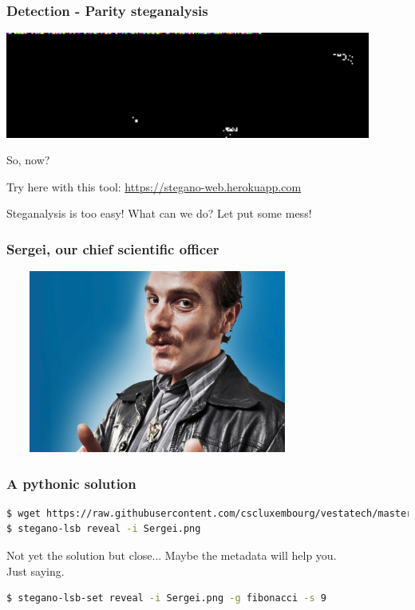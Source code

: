 \documentclass[]{beamer}
\begin{document}
\begin{frame}
\frametitle{Detection - Parity steganalysis}
\begin{center}
\includegraphics[width=12.0cm]{./images/vesta_steg_zoom.png}
\end{center}
\bigskip
So, now?

\bigskip
Try here with this tool: \href{https://stegano-web.herokuapp.com}{https://stegano-web.herokuapp.com}

\bigskip 
Steganalysis is too easy! What can we do? Let put some mess!
\end{frame}

\begin{frame}
\frametitle{Sergei, our chief scientific officer}
\begin{center}
    \includegraphics[height=6.0cm, width=10.0cm]{./images/Sergei.png}
\end{center}
\end{frame}

\begin{frame}[fragile]
\frametitle{A pythonic solution}
\begin{lstlisting}[language=Bash]
$ wget https://raw.githubusercontent.com/cscluxembourg/vestatech/master/challenges/sergei/Sergei.png
$ stegano-lsb reveal -i Sergei.png
\end{lstlisting}
Not yet the solution but close... Maybe the metadata will help you.\\Just saying.
\bigskip

\begin{lstlisting}[language=Bash]
$ stegano-lsb-set reveal -i Sergei.png -g fibonacci -s 9
\end{lstlisting}
\end{frame}
\end{document}
